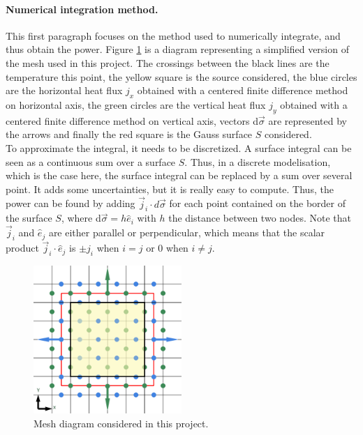 \documentclass[a4paper,12pt,twoside]{article}
\begin{document}
\paragraph{Numerical integration method.}
This first paragraph focuses on the method used to numerically integrate, and thus obtain the power.
Figure \ref{fig:d-mailles} is a diagram representing a simplified version of the mesh used in this project.
The crossings between the black lines are the temperature this point, the yellow square is the source considered, the blue circles are the horizontal heat flux $j_x$ obtained with a centered finite difference method on horizontal axis, the green circles are the vertical heat flux $j_y$ obtained with a centered finite difference method on vertical axis, vectors d$\vec{\sigma}$ are represented by the arrows and finally the red square is the Gauss surface $S$ considered.\\
To approximate the integral, it needs to be discretized.
A surface integral can be seen as a continuous sum over a surface $S$.
Thus, in a discrete modelisation, which is the case here, the surface integral can be replaced by a sum over several point.
It adds some uncertainties, but it is really easy to compute.
Thus, the power can be found by adding $\vec{j}_i\cdot d\vec{\sigma}$ for each point contained on the border of the surface $S$, where d$\vec{\sigma} = h\hat{e}_i$ with $h$ the distance between two nodes.
Note that $\vec{j}_i$ and $\hat{e}_j$ are either parallel or perpendicular, which means that the scalar product $\vec{j}_i\cdot\hat{e}_j$ is $\pm j_i$ when $i=j$ or $0$ when $i \neq j$.

\begin{figure}[h]
  \centering
  \includegraphics[width=0.5\textwidth]{graphs/d_mailles.eps}
  \caption{Mesh diagram considered in this project.}
  \label{fig:d-mailles}
\end{figure}
\end{document}
